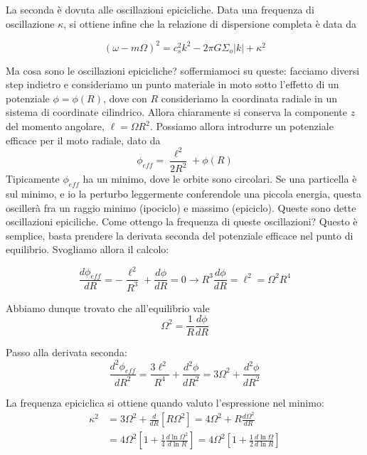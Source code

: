 \documentclass{report}
\begin{document}
La seconda è dovuta alle oscillazioni epicicliche. Data una frequenza di oscillazione $\kappa$, si ottiene infine che la relazione di dispersione completa è data da 
\begin{tcolorbox}[colback=myg!15, colframe=black, boxrule=1pt]
\begin{equation}
    (\omega - m\Omega)^2 = c_s^2k^2 - 2\pi G \Sigma_o |k|+ \kappa^2
\end{equation}
\end{tcolorbox}

Ma cosa sono le oscillazioni epicicliche? soffermiamoci su queste: facciamo diversi step indietro e consideriamo un punto materiale in moto sotto l'effetto di un potenziale $\phi = \phi (R)$, dove con $R$ consideriamo la coordinata radiale in un sistema di coordinate cilindrico. Allora chiaramente si conserva la componente $z$ del momento angolare, $\ell = \Omega R^2$. Possiamo allora introdurre un potenziale efficace per il moto radiale, dato da 
\begin{equation}
    \phi_{eff}= \frac{\ell^2}{2R^2} + \phi(R)
\end{equation}
Tipicamente $\phi_{eff}$ ha un minimo, dove le orbite sono circolari. Se una particella è sul minimo, e io la perturbo leggermente conferendole una piccola energia, questa oscillerà fra un raggio minimo (ipociclo) e massimo (epiciclo). Queste sono dette oscillazioni epiciliche. Come ottengo la frequenza di queste oscillazioni? Questo è semplice, basta prendere la derivata seconda del potenziale efficace nel punto di equilibrio. Svogliamo allora il calcolo: 

\begin{equation}
    \frac{d\phi_{eff}}{dR} = - \frac{\ell^2}{R^3} + \frac{d\phi}{dR} = 0 \rightarrow R^3 \frac{d\phi}{dR} = \ell ^2 = \Omega^2 R^4 
\end{equation}

Abbiamo dunque trovato che all'equilibrio vale 
\begin{equation}
    \Omega^2 = \frac{1}{R}\frac{d\phi}{dR}
\end{equation}

Passo alla derivata seconda: 
\begin{equation}
    \frac{d^2\phi_{eff}}{dR^2} = \frac{3\ell^2}{R^4} + \frac{d^2\phi}{dR^2} = 3\Omega^2 + \frac{d^2\phi}{dR^2}
\end{equation}

La frequenza epiciclica si ottiene quando valuto l'espressione nel minimo: 
\begin{align}
    \kappa^2 &= 3\Omega^2 + \frac{d}{dR}\left[R\Omega^2\right] = 4\Omega^2 + R\frac{d\Omega^2}{dR} \\
    &= 4\Omega^2\left[1 + \frac{1}{4}\frac{d\ln{\Omega^2}}{d\ln R}\right] = 4\Omega^2\left[1 + \frac{1}{2}\frac{d\ln{\Omega}}{d\ln R}\right] 
\end{align}
\end{document}
